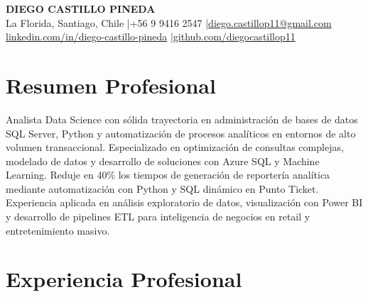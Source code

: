 \documentclass[11pt,letterpaper]{article}
\begin{document}
\begin{center}
{\fontsize{16}{19}\selectfont\textbf{\MakeUppercase{Diego Castillo Pineda}}}\\[4pt]
{\small La Florida, Santiago, Chile \quad|\quad +56 9 9416 2547 \quad|\quad \href{mailto:diego.castillop11@gmail.com}{diego.castillop11@gmail.com}\\
\href{https://linkedin.com/in/diego-castillo-pineda}{linkedin.com/in/diego-castillo-pineda} \quad|\quad \href{https://github.com/diegocastillop11}{github.com/diegocastillop11}}
\end{center}

\section{Resumen Profesional}
Analista Data Science con sólida trayectoria en administración de bases de datos SQL Server, Python y automatización de procesos analíticos en entornos de alto volumen transaccional. Especializado en optimización de consultas complejas, modelado de datos y desarrollo de soluciones con Azure SQL y Machine Learning. Reduje en 40\% los tiempos de generación de reportería analítica mediante automatización con Python y SQL dinámico en Punto Ticket. Experiencia aplicada en análisis exploratorio de datos, visualización con Power BI y desarrollo de pipelines ETL para inteligencia de negocios en retail y entretenimiento masivo.

\section{Experiencia Profesional}
\end{document}
